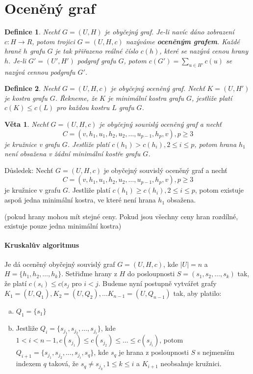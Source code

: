 \documentclass[a4paper, 11pt]{report}
\newtheorem{mydef}{Definice}[chapter]
\newtheorem{veta}{Věta}[chapter]
\begin{document}
\section{Oceněný graf}
\begin{mydef}
Nechť $G=(U, H)$ je obyčejný graf. Je-li navíc dáno zobrazení $c: H\to R$, potom trojici $G=(U, H, c)$ nazýváme \textbf{oceněným grafem}. Každé hraně $h$ grafu $G$ je tak přiřazeno reálné číslo $c(h)$, které se nazývá cenou hrany $h$. Je-li $G'=(U', H')$ podgraf grafu $G$, potom $c(G') = \sum\limits_{u \in H'} c(u)$ se nazývá cennou podgrafu $G'$.
\end{mydef}

\begin{mydef}
Nechť $G=(U, H, c)$ je obyčejný oceněný graf. Nechť $K=(U, H')$ je kostra grafu $G$. Řekneme, že $K$ je minimální kostra grafu $G$, jestliže platí $c(K) \leq c(L)$ pro každou kostru $L$ grafu $G$.
\end{mydef}

\begin{veta}
Nechť $G=(U, H, c)$ je obyčejný souvislý oceněný graf a nechť
$$C=(v, h_1, u_1, h_2, u_2, \dots, u_{p-1}, h_p, v), p \geq 3$$
je kružnice v grafu $G$. Jestliže platí $c(h_1) > c(h_i), 2 \leq i \leq p$, potom hrana $h_1$ není obsažena v žádní minimální kostře grafu $G$.
\end{veta}

Důsledek: Nechť $G=(U, H, c)$ je obyčejný souvislý oceněný graf a nechť
$$C=(v, h_1, u_1, h_2, u_2, \dots, u_{p-1}, h_p, v), p \geq 3$$
je kružnice v grafu $G$. Jestliže platí $c(h_1) \geq c(h_i), 2 \leq i \leq p$, potom existuje aspoň jedna minimální kostra, ve které není hrana $h_1$ obsažena.

(pokud hrany mohou mít stejné ceny. Pokud jsou všechny ceny hran rozdílné, existuje pouze jedna minimální kostra)

\paragraph{Kruskalův algoritmus}
Je dá oceněný obyčejný souvislý graf $G=(U, H, c)$, kde $|U| = n$ a $H = \{h_1, h_2, \dots, h_k\}$. Setřiďme hrany z $H$ do posloupnosti $S=(s_1, s_2, \dots, s_k)$ tak, že platí $c(s_i) \leq c(s_{j}$ pro $i<j$. Budeme nyní postupně vytvářet grafy $K_1=(U, Q_1), K_2=(U, Q_2), \dots K_{n-1} = (U, Q_{n-1})$ tak, aby platilo:
\begin{enumerate}[(a)]
	\item $Q_1 = \{s_1\}$
	\item Jestliže $Q_i = \{s_{j_1}, s_{j_2}, \dots, s_{j_i}\}$, kde $1 < i < n-1, c(s_{j_1}) \leq c(s_{j_2}) \leq \dots \leq c(s_{j_i})$, potom $Q_{i+1} = \{s_{j_1}, s_{j_2}, \dots, s_{j_i}, s_q\}$, kde $s_q$ je hrana z posloupnosti $S$ s nejmenším indexem $q$ taková, že $s_q \not= s_{j_k}, 1 \leq k \leq i$ a $K_{i+1}$ neobsahuje kružnici.
\end{enumerate}
\end{document}

